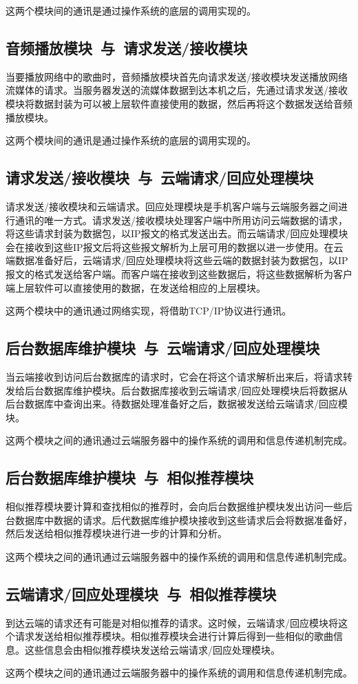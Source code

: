 这两个模块间的通讯是通过操作系统的底层的调用实现的。

\subsection{音频播放模块\ 与\ 请求发送/接收模块}
当要播放网络中的歌曲时，音频播放模块首先向请求发送/接收模块发送播放网络流媒体的请求。当服务器发送的流媒体数据到达本机之后，先通过请求发送/接收模块将数据封装为可以被上层软件直接使用的数据，然后再将这个数据发送给音频播放模块。

这两个模块间的通讯是通过操作系统的底层的调用实现的。

\subsection{请求发送/接收模块\ 与\ 云端请求/回应处理模块}
请求发送/接收模块和云端请求。回应处理模块是手机客户端与云端服务器之间进行通讯的唯一方式。请求发送/接收模块处理客户端中所用访问云端数据的请求，将这些请求封装为数据包，以IP报文的格式发送出去。而云端请求/回应处理模块会在接收到这些IP报文后将这些报文解析为上层可用的数据以进一步使用。在云端数据准备好后，云端请求/回应处理模块将这些云端的数据封装为数据包，以IP报文的格式发送给客户端。而客户端在接收到这些数据后，将这些数据解析为客户端上层软件可以直接使用的数据，在发送给相应的上层模块。

这两个模块中的通讯通过网络实现，将借助TCP/IP协议进行通讯。

\subsection{后台数据库维护模块\ 与\ 云端请求/回应处理模块}
当云端接收到访问后台数据库的请求时，它会在将这个请求解析出来后，将请求转发给后台数据库维护模块。后台数据库接收到云端请求/回应处理模块后将数据从后台数据库中查询出来。待数据处理准备好之后，数据被发送给云端请求/回应模块。

这两个模块之间的通讯通过云端服务器中的操作系统的调用和信息传递机制完成。

\subsection{后台数据库维护模块\ 与\ 相似推荐模块}
相似推荐模块要计算和查找相似的推荐时，会向后台数据维护模块发出访问一些后台数据库中数据的请求。后代数据库维护模块接收到这些请求后会将数据准备好，然后发送给相似推荐模块进行进一步的计算和分析。

这两个模块之间的通讯通过云端服务器中的操作系统的调用和信息传递机制完成。

\subsection{云端请求/回应处理模块\ 与\ 相似推荐模块}
到达云端的请求还有可能是对相似推荐的请求。这时候，云端请求/回应模块将这个请求发送给相似推荐模块。相似推荐模块会进行计算后得到一些相似的歌曲信息。这些信息会由相似推荐模块发送给云端请求/回应处理模块。

这两个模块之间的通讯通过云端服务器中的操作系统的调用和信息传递机制完成。

